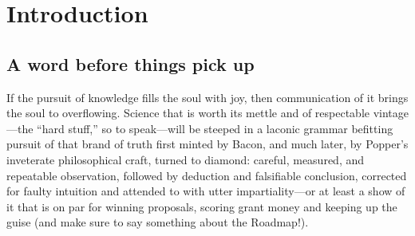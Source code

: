 
\chapter{Introduction}
\label{chp:intro}


\section{A word before things pick up}

If the pursuit of knowledge fills the soul with joy, then
communication of it brings the soul to overflowing. Science that is
worth its mettle and of respectable vintage---the ``hard stuff,'' so
to speak---will be steeped in a laconic grammar befitting pursuit of
that brand of truth first minted by Bacon, and much later, by Popper's
inveterate philosophical craft, turned to diamond: careful, measured,
and repeatable observation, followed by deduction and falsifiable
conclusion, corrected for faulty intuition and attended to with utter
impartiality---or at least a show of it that is on par for winning
proposals, scoring grant money and keeping up the guise (and make sure
to say something about the Roadmap!).

